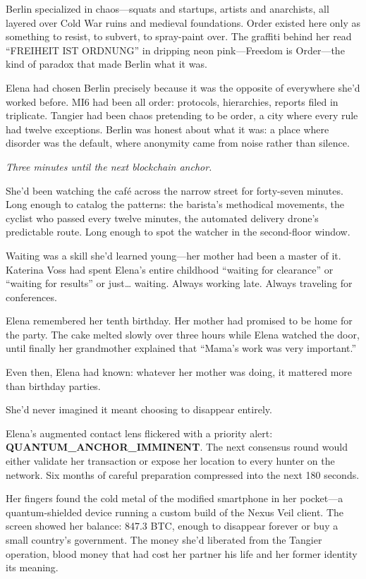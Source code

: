 \documentclass[12pt,letterpaper]{book}
\begin{document}
Berlin specialized in chaos---squats and startups, artists and anarchists, all layered over Cold War ruins and medieval foundations. Order existed here only as something to resist, to subvert, to spray-paint over. The graffiti behind her read ``FREIHEIT IST ORDNUNG'' in dripping neon pink---Freedom is Order---the kind of paradox that made Berlin what it was.

Elena had chosen Berlin precisely because it was the opposite of everywhere she'd worked before. MI6 had been all order: protocols, hierarchies, reports filed in triplicate. Tangier had been chaos pretending to be order, a city where every rule had twelve exceptions. Berlin was honest about what it was: a place where disorder was the default, where anonymity came from noise rather than silence.

\emph{Three minutes until the next blockchain anchor.}

She'd been watching the café across the narrow street for forty-seven minutes. Long enough to catalog the patterns: the barista's methodical movements, the cyclist who passed every twelve minutes, the automated delivery drone's predictable route. Long enough to spot the watcher in the second-floor window.

Waiting was a skill she'd learned young---her mother had been a master of it. Katerina Voss had spent Elena's entire childhood ``waiting for clearance'' or ``waiting for results'' or just\ldots{} waiting. Always working late. Always traveling for conferences.

Elena remembered her tenth birthday. Her mother had promised to be home for the party. The cake melted slowly over three hours while Elena watched the door, until finally her grandmother explained that ``Mama's work was very important.''

Even then, Elena had known: whatever her mother was doing, it mattered more than birthday parties.

She'd never imagined it meant choosing to disappear entirely.

Elena's augmented contact lens flickered with a priority alert: \textbf{QUANTUM\_ANCHOR\_IMMINENT}. The next consensus round would either validate her transaction or expose her location to every hunter on the network. Six months of careful preparation compressed into the next 180 seconds.

Her fingers found the cold metal of the modified smartphone in her pocket---a quantum-shielded device running a custom build of the Nexus Veil client. The screen showed her balance: 847.3 BTC, enough to disappear forever or buy a small country's government. The money she'd liberated from the Tangier operation, blood money that had cost her partner his life and her former identity its meaning.
\end{document}
